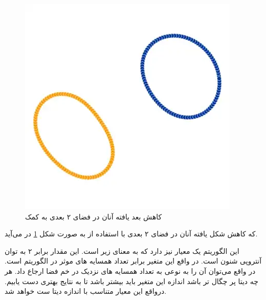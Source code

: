 \documentclass{article}
\begin{document}
\begin{figure}[h!]
	\centering
	\includegraphics[width=0.4\columnwidth]{figs/tsne1.png}
	\caption{ کاهش بعد یافته آنان در فضای ۲ بعدی به کمک }
	\label{fig:tsne1}
\end{figure}

که کاهش شکل یافته آنان در فضای ۲ بعدی با استفاده از 
به صورت شکل \ref{fig:tsne1} در می‌آید.

این الگوریتم یک معیار  نیز دارد که به معنای زیر است.
این مقدار برابر ۲ به توان آنتروپی شنون است. در واقع این متغیر برابر تعداد همسایه های موثر در الگوریتم است. در واقع می‌توان آن را به نوعی به تعداد همسایه های نزدیک در خم فضا ارجاع داد.
هر چه دیتا پر چگال تر باشد اندازه این متغیر باید بیشتر باشد تا به نتایج بهتری دست یابیم.
درواقع این معیار متناسب با اندازه دیتا ست خواهد شد.
\end{document}
